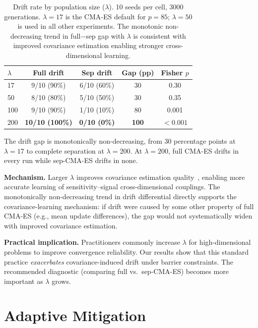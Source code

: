 \documentclass[twoside,11pt]{article}
\begin{document}
\begin{table}[t]
\caption{Drift rate by population size ($\lambda$). 10 seeds per cell,
3000 generations. $\lambda = 17$ is the CMA-ES default for $p = 85$;
$\lambda = 50$ is used in all other experiments. The monotonic non-decreasing trend in
full$-$sep gap with $\lambda$ is consistent with improved covariance
estimation enabling stronger cross-dimensional learning.}
\label{tab:lambda}
\centering
\begin{tabular}{lcccc}
\toprule
$\lambda$ & Full drift & Sep drift & Gap (pp) & Fisher $p$ \\
\midrule
17  & 9/10 (90\%)  & 6/10 (60\%)  & 30  & 0.30 \\
50  & 8/10 (80\%)  & 5/10 (50\%)  & 30  & 0.35 \\
100 & 9/10 (90\%)  & 1/10 (10\%)  & 80  & 0.001 \\
200 & \textbf{10/10 (100\%)} & \textbf{0/10 (0\%)} & \textbf{100} & $< 0.001$ \\
\bottomrule
\end{tabular}
\end{table}

The drift gap is monotonically non-decreasing, from 30 percentage points at
$\lambda = 17$ to complete separation at $\lambda = 200$. At $\lambda = 200$,
full CMA-ES drifts in every run while sep-CMA-ES drifts in none.

\textbf{Mechanism.} Larger $\lambda$ improves covariance
estimation quality~\citep{hansen2003reducing}, enabling more accurate
learning of sensitivity--signal cross-dimensional couplings. The monotonically non-decreasing trend
in drift differential directly supports the covariance-learning
mechanism: if drift were caused by some other property of full CMA-ES
(e.g., mean update differences), the gap would not systematically widen
with improved covariance estimation.

\textbf{Practical implication.} Practitioners commonly increase $\lambda$
for high-dimensional problems to improve convergence reliability. Our results
show that this standard practice \emph{exacerbates} covariance-induced drift
under barrier constraints. The recommended diagnostic (comparing full vs.\
sep-CMA-ES) becomes more important as $\lambda$ grows.

\section{Adaptive Mitigation}
\label{sec:mitigation}
\end{document}
